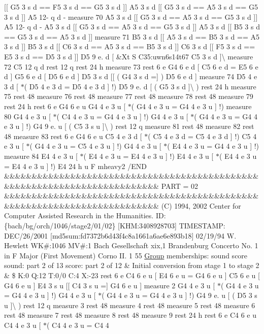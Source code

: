 \mbox{[}\mbox{[} G5 3 s d == F5 3 s d == G5 3 s d \mbox{]}\mbox{]} A5 3 s d \mbox{[}\mbox{[} G5 3 s d == A5 3 s d == G5 3 s d \mbox{]}\mbox{]} A5 12-\/ q d -\/ measure 70 A5 3 s d \mbox{[}\mbox{[} G5 3 s d == A5 3 s d == G5 3 s d \mbox{]}\mbox{]} A5 12-\/ q d -\/ A5 3 s d \mbox{[}\mbox{[} G5 3 s d == A5 3 s d == G5 3 s d \mbox{]}\mbox{]} A5 3 s d \mbox{[}\mbox{[} B5 3 s d == G5 3 s d == A5 3 s d \mbox{]}\mbox{]} measure 71 B5 3 s d \mbox{[}\mbox{[} A5 3 s d == B5 3 s d == A5 3 s d \mbox{]}\mbox{]} B5 3 s d \mbox{[}\mbox{[} C6 3 s d == A5 3 s d == B5 3 s d \mbox{]}\mbox{]} C6 3 s d \mbox{[}\mbox{[} F5 3 s d == E5 3 s d == D5 3 s d \mbox{]}\mbox{]} D5 9 e. d \mbox{[} \&Xt S C35\+:uwn6s14t67 C5 3 s d \mbox{]}\textbackslash{} measure 72 C5 12 q d rest 12 q rest 24 h measure 73 rest 6 e G4 6 e d \mbox{[} C5 6 e d = E5 6 e d \mbox{]} G5 6 e d \mbox{[} D5 6 e d \mbox{]} D5 3 s d \mbox{[}\mbox{[} ( G4 3 s d =\mbox{]} ) D5 6 e d \mbox{]} measure 74 D5 4 e 3 d \mbox{[} $\ast$( D5 4 e 3 d = D5 4 e 3 d \mbox{]} !) D5 9 e. d \mbox{[} ( G5 3 s d \mbox{]}\textbackslash{} ) rest 24 h measure 75 rest 48 measure 76 rest 48 measure 77 rest 48 measure 78 rest 48 measure 79 rest 24 h rest 6 e G4 6 e u G4 4 e 3 u \mbox{[} $\ast$( G4 4 e 3 u = G4 4 e 3 u \mbox{]} !) measure 80 G4 4 e 3 u \mbox{[} $\ast$( C4 4 e 3 u = G4 4 e 3 u \mbox{]} !) G4 4 e 3 u \mbox{[} $\ast$( G4 4 e 3 u = G4 4 e 3 u \mbox{]} !) G4 9 e. u \mbox{[} ( C5 3 s u \mbox{]}\textbackslash{} ) rest 12 q measure 81 rest 48 measure 82 rest 48 measure 83 rest 6 e G4 6 e u C5 4 e 3 d \mbox{[} $\ast$( C5 4 e 3 d = C5 4 e 3 d \mbox{]} !) C5 4 e 3 u \mbox{[} $\ast$( G4 4 e 3 u = C5 4 e 3 u \mbox{]} !) G4 4 e 3 u \mbox{[} $\ast$( E4 4 e 3 u = G4 4 e 3 u \mbox{]} !) measure 84 E4 4 e 3 u \mbox{[} $\ast$( E4 4 e 3 u = E4 4 e 3 u \mbox{]} !) E4 4 e 3 u \mbox{[} $\ast$( E4 4 e 3 u = E4 4 e 3 u \mbox{]} !) E4 24 h u F mheavy2 /\+E\+ND \&\&\&\&\&\&\&\&\&\&\&\&\&\&\&\&\&\&\&\&\&\&\&\&\&\&\&\&\&\&\&\&\&\&\&\&\&\&\&\&\&\&\&\&\&\&\&\&\&\&\&\&\&\&\&\&\&\&\&\&\&\&\&\&\&\&\&\&\&\&\&\&\&\& P\+A\+RT = 02 \&\&\&\&\&\&\&\&\&\&\&\&\&\&\&\&\&\&\&\&\&\&\&\&\&\&\&\&\&\&\&\&\&\&\&\&\&\&\&\&\&\&\&\&\&\&\&\&\&\&\&\&\&\&\&\&\&\&\&\&\&\&\&\&\&\&\&\&\&\&\&\&\&\& (C) 1994, 2002 Center for Computer Assisted Research in the Humanities. ID\+: \{bach/bg/orch/1046/stage2/01/02\} \mbox{[}K\+HM\+:3408928703\mbox{]} T\+I\+M\+E\+S\+T\+A\+MP\+: D\+E\+C/26/2001 \mbox{[}md5sum\+:fd7372b6d43f4c8a1661a6ae6e893b18\mbox{]} 02/19/94 W. Hewlett WK\#\+:1046 MV\#\+:1 Bach Gesellschaft xix,1 Brandenburg Concerto No. 1 in F Major (First Movement) Corno II. 1 55 \hyperlink{class_group}{Group} memberships\+: sound score sound\+: part 2 of 13 score\+: part 2 of 12 \& Initial conversion from stage 1 to stage 2 \& \$ K\+:0 Q\+:12 T\+:0/0 C\+:4 X\+:-\/23 rest 6 e C4 6 e u \mbox{[} E4 6 e u = G4 6 e u \mbox{]} C5 6 e u \mbox{[} G4 6 e u \mbox{]} E4 3 s u \mbox{[}\mbox{[} C4 3 s u =\mbox{]} G4 6 e u \mbox{]} measure 2 G4 4 e 3 u \mbox{[} $\ast$( G4 4 e 3 u = G4 4 e 3 u \mbox{]} !) G4 4 e 3 u \mbox{[} $\ast$( G4 4 e 3 u = G4 4 e 3 u \mbox{]} !) G4 9 e. u \mbox{[} ( D5 3 s u \mbox{]}\textbackslash{} ) rest 12 q measure 3 rest 48 measure 4 rest 48 measure 5 rest 48 measure 6 rest 48 measure 7 rest 48 measure 8 rest 48 measure 9 rest 24 h rest 6 e C4 6 e u C4 4 e 3 u \mbox{[} $\ast$( C4 4 e 3 u = C4 4 